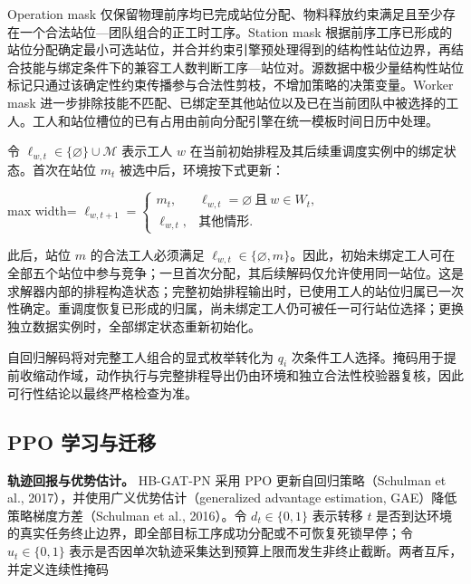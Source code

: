 \documentclass[journal,10pt]{IEEEtran}
\begin{document}
Operation mask 仅保留物理前序均已完成站位分配、物料释放约束满足且至少存在一个合法站位---团队组合的正工时工序。Station mask 根据前序工序已形成的站位分配确定最小可选站位，并合并约束引擎预处理得到的结构性站位边界，再结合技能与绑定条件下的兼容工人数判断工序---站位对。源数据中极少量结构性站位标记只通过该确定性约束传播参与合法性剪枝，不增加策略的决策变量。Worker mask 进一步排除技能不匹配、已绑定至其他站位以及已在当前团队中被选择的工人。工人和站位槽位的已有占用由前向分配引擎在统一模板时间日历中处理。

令 \(\ell_{w,t}\in\lbrace{}\varnothing\rbrace{}\cup\mathcal M\) 表示工人 \(w\) 在当前初始排程及其后续重调度实例中的绑定状态。首次在站位 \(m_t\) 被选中后，环境按下式更新：

\begin{center}
\begin{adjustbox}{max width=\columnwidth}
$\displaystyle
\ell_{w,t+1}=
\begin{cases}
m_t, & \ell_{w,t}=\varnothing\ \text{且}\ w\in W_t,\\
\ell_{w,t}, & \text{其他情形}.
\end{cases}
$
\end{adjustbox}
\end{center}

此后，站位 \(m\) 的合法工人必须满足 \(\ell_{w,t}\in\lbrace{}\varnothing,m\rbrace{}\)。因此，初始未绑定工人可在全部五个站位中参与竞争；一旦首次分配，其后续解码仅允许使用同一站位。这是求解器内部的排程构造状态；完整初始排程输出时，已使用工人的站位归属已一次性确定。重调度恢复已形成的归属，尚未绑定工人仍可被任一可行站位选择；更换独立数据实例时，全部绑定状态重新初始化。

自回归解码将对完整工人组合的显式枚举转化为 \(q_i\) 次条件工人选择。掩码用于提前收缩动作域，动作执行与完整排程导出仍由环境和独立合法性校验器复核，因此可行性结论以最终严格检查为准。

\subsection{PPO 学习与迁移}\label{ppo-ux5b66ux4e60ux4e0eux8fc1ux79fb}

\textbf{轨迹回报与优势估计。} HB-GAT-PN 采用 PPO 更新自回归策略（Schulman et al., 2017），并使用广义优势估计（generalized advantage estimation, GAE）降低策略梯度方差（Schulman et al., 2016）。令 \(d_t\in\lbrace{}0,1\rbrace{}\) 表示转移 \(t\) 是否到达环境的真实任务终止边界，即全部目标工序成功分配或不可恢复死锁早停；令 \(u_t\in\lbrace{}0,1\rbrace{}\) 表示是否因单次轨迹采集达到预算上限而发生非终止截断。两者互斥，并定义连续性掩码
\end{document}
